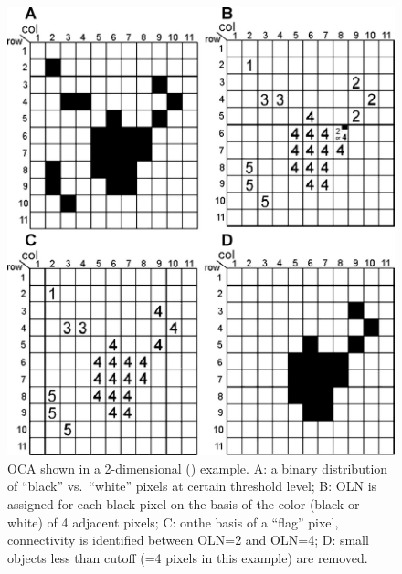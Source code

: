 \begin{figure}[p]
	\centering
	\includegraphics[width=\imsize]{img/Tsuda2008/Tsuda-03}
	\caption[Object connectivity analysis]{\acf{OCA} shown in a 2-dimensional (\twod) example. A: a binary distribution of ``black'' vs.\ ``white'' pixels at certain threshold level; B: \acf{OLN} is assigned for each black pixel on the basis of the color (black or white) of 4 adjacent pixels; C: onthe basis of a ``flag'' pixel, connectivity is identified between \ac{OLN}=2 and \ac{OLN}=4; D: small objects
less than cutoff (=4 pixels in this example) are removed.}
	\label{fig:oca}
\end{figure}

